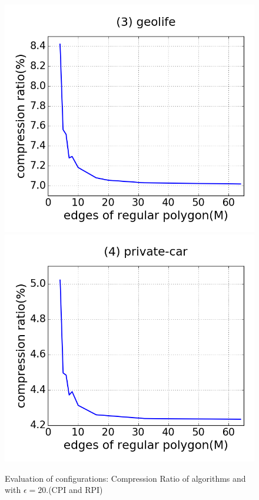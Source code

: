 \begin{figure}[tb!]
\includegraphics[scale = 0.250]{figures/Exp-M-cr-geolife.png}
\includegraphics[scale = 0.250]{figures/Exp-M-cr-private.png}
\vspace{-2ex}
\caption{\small Evaluation of configurations: Compression Ratio of algorithms \cist and \cista with $\epsilon = 20$.(CPI and RPI)}
\label{fig:m-cr-e20}
\vspace{-1ex}
\end{figure}

